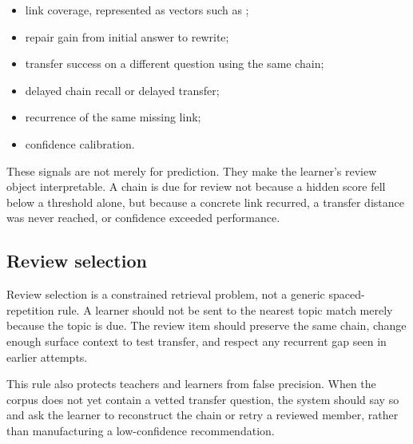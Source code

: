 \documentclass[11pt]{article}
\begin{document}
\begin{itemize}
\item link coverage, represented as vectors such as ;
\item repair gain from initial answer to rewrite;
\item transfer success on a different question using the same chain;
\item delayed chain recall or delayed transfer;
\item recurrence of the same missing link;
\item confidence calibration.
\end{itemize}

These signals are not merely for prediction. They make the learner's review object interpretable. A chain is due for review not because a hidden score fell below a threshold alone, but because a concrete link recurred, a transfer distance was never reached, or confidence exceeded performance.

\subsection{Review selection}

Review selection is a constrained retrieval problem, not a generic spaced-repetition rule. A learner should not be sent to the nearest topic match merely because the topic is due. The review item should preserve the same chain, change enough surface context to test transfer, and respect any recurrent gap seen in earlier attempts.


This rule also protects teachers and learners from false precision. When the corpus does not yet contain a vetted transfer question, the system should say so and ask the learner to reconstruct the chain or retry a reviewed member, rather than manufacturing a low-confidence recommendation.
\end{document}
